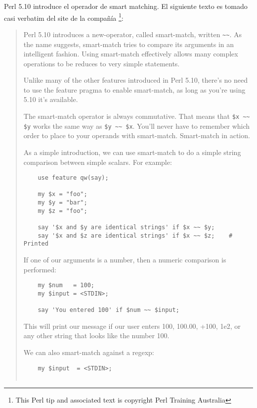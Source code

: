 
Perl 5.10 introduce el operador de smart matching.
El siguiente texto es tomado casi verbatim del site de la compañía 
\footnote{
This Perl tip and associated text is copyright Perl Training Australia}:
\begin{it}
\begin{quotation}
Perl 5.10 introduces a new-operator, called smart-match, written \verb|~~|. As
the name suggests, smart-match tries to compare its arguments in an
intelligent fashion. Using smart-match effectively allows many complex
operations to be reduces to very simple statements.

Unlike many of the other features introduced in Perl 5.10, there's no
need to use the feature pragma to enable smart-match, as long as you're
using 5.10 it's available.

The smart-match operator is always commutative. That means that 
\verb|$x ~~ $y| works the same way as 
\verb|$y ~~ $x|. You'll never have to remember which
order to place to your operands with smart-match.
Smart-match in action.

As a simple introduction, we can use smart-match to do a simple string comparison between simple scalars. For example:

\begin{verbatim}
    use feature qw(say);

    my $x = "foo";
    my $y = "bar";
    my $z = "foo";

    say '$x and $y are identical strings' if $x ~~ $y;
    say '$x and $z are identical strings' if $x ~~ $z;    # Printed
\end{verbatim}

If one of our arguments is a number, then a numeric comparison is performed:

\begin{verbatim}
    my $num   = 100;
    my $input = <STDIN>;

    say 'You entered 100' if $num ~~ $input;
\end{verbatim}

This will print our message if our user enters 100, 100.00, +100, 1e2, or
any other string that looks like the number 100. 

We can also smart-match
against a regexp:

\begin{verbatim}
    my $input  = <STDIN>;


\end{verbatim}
\end{quotation}
\end{it}

